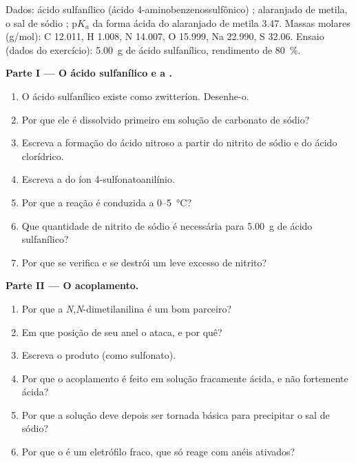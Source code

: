 \begin{problem}
\label{pb:b2:amines:1}
Dados: ácido sulfanílico (ácido 4-aminobenzenossulfônico) ; alaranjado
de metila, o sal de sódio ; $\mathrm pK_a$ da forma ácida do
alaranjado de metila 3.47. Massas molares (\unit{g/mol}): C 12.011, H 1.008,
N 14.007, O 15.999, Na 22.990, S 32.06. Ensaio (dados do exercício):
\qty{5.00}{g} de ácido sulfanílico, rendimento de 80~\%.

\medskip
\noindent\textbf{Parte I --- O ácido sulfanílico e a .}
\begin{enumerate}
  \item O ácido sulfanílico existe como zwitteríon. Desenhe-o.
  \item Por que ele é dissolvido primeiro em solução de carbonato de sódio?
  \item Escreva a formação do ácido nitroso a partir do nitrito de sódio e do ácido clorídrico.
  \item Escreva a  do íon 4-sulfonatoanilínio.
  \item Por que a reação é conduzida a 0--\qty{5}{\degreeCelsius}?
  \item Que quantidade de nitrito de sódio é necessária para \qty{5.00}{g} de ácido sulfanílico?
  \item Por que se verifica e se destrói um leve excesso de nitrito?
\end{enumerate}

\medskip
\noindent\textbf{Parte II --- O acoplamento.}
\begin{enumerate}[resume]
  \item Por que a \textit{N},\textit{N}-dimetilanilina é um bom parceiro?
  \item Em que posição de seu anel o  ataca, e por quê?
  \item Escreva o produto (como sulfonato).
  \item Por que o acoplamento é feito em solução fracamente ácida, e não fortemente ácida?
  \item Por que a solução deve depois ser tornada básica para precipitar o sal de sódio?
  \item Por que o  é um eletrófilo fraco, que só reage com anéis ativados?
\end{enumerate}


\end{problem}
